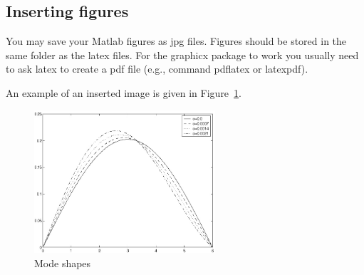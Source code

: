 \documentclass[11pt]{book}
\begin{document}
\subsection{Inserting figures}


You may save your Matlab figures as jpg files.  Figures should  be stored in the 
same folder as the latex files.
For the graphicx package to work you usually need to ask latex to create a pdf file (e.g., command pdflatex or latexpdf).

An example of an inserted image is given in Figure~\ref{fig:modes}.

\begin{center}
\begin{figure}[h]
		\centering
		\includegraphics[width=0.6\textwidth]{modes}
		\caption{Mode shapes}
		\label{fig:modes}
\end{figure}
\end{center}




 
\end{document}
